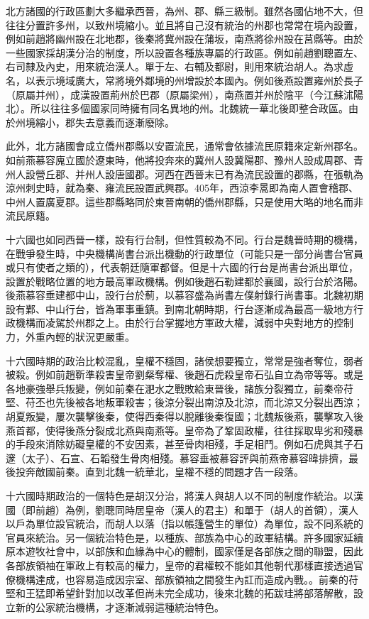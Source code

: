 北方諸國的行政區劃大多繼承西晉，為州、郡、縣三級制。雖然各國佔地不大，但往往分置許多州，以致州境縮小。並且將自己沒有統治的州郡也常常在境內設置，例如前趙將幽州設在北地郡，後秦將冀州設在蒲坂，南燕將徐州設在莒縣等。由於一些國家採胡漢分治的制度，所以設置各種族專屬的行政區。例如前趙劉聰置左、右司隸及內史，用來統治漢人。單于左、右輔及都尉，則用來統治胡人。為求虛名，以表示境域廣大，常將境外鄰境的州增設於本國內。例如後燕設置雍州於長子（原屬并州），成漢設置荊州於巴郡（原屬梁州），南燕置并州於陰平（今江蘇沭陽北）。所以往往多個國家同時擁有同名異地的州。北魏統一華北後即整合政區。由於州境縮小，郡失去意義而逐漸廢除。

此外，北方諸國會成立僑州郡縣以安置流民，通常會依據流民原籍來定新州郡名。如前燕慕容廆立國於遼東時，他將投奔來的冀州人設冀陽郡、豫州人設成周郡、青州人設營丘郡、并州人設唐國郡。河西在西晉末已有為流民設置的郡縣，在張軌為涼州刺史時，就為秦、雍流民設置武興郡。405年，西涼李暠即為南人置會稽郡、中州人置廣夏郡。這些郡縣略同於東晉南朝的僑州郡縣，只是使用大略的地名而非流民原籍。

十六國也如同西晉一樣，設有行台制，但性質較為不同。行台是魏晉時期的機構，在戰爭發生時，中央機構尚書台派出機動的行政單位（可能只是一部分尚書台官員或只有使者之類的），代表朝廷隨軍都督。但是十六國的行台是尚書台派出單位，設置於戰略位置的地方最高軍政機構。例如後趙石勒建都於襄國，設行台於洛陽。後燕慕容垂建都中山，設行台於薊，以慕容盛為尚書左僕射錄行尚書事。北魏初期設有鄴、中山行台，皆為軍事重鎮。到南北朝時期，行台逐漸成為最高一級地方行政機構而凌駕於州郡之上。由於行台掌握地方軍政大權，減弱中央對地方的控制力，外重內輕的狀況更嚴重。

十六國時期的政治比較混亂，皇權不穩固，諸侯想要獨立，常常是強者奪位，弱者被殺。例如前趙靳準殺害皇帝劉粲奪權、後趙石虎殺皇帝石弘自立為帝等等。或是各地豪強舉兵叛變，例如前秦在淝水之戰敗給東晉後，諸族分裂獨立，前秦帝苻堅、苻丕也先後被各地叛軍殺害；後涼分裂出南涼及北涼，而北涼又分裂出西涼；胡夏叛變，屢次襲擊後秦，使得西秦得以脫離後秦復國；北魏叛後燕，襲擊攻入後燕首都，使得後燕分裂成北燕與南燕等。皇帝為了鞏固政權，往往採取卑劣和殘暴的手段來消除妨礙皇權的不安因素，甚至骨肉相殘，手足相鬥。例如石虎與其子石邃（太子）、石宣、石韜發生骨肉相殘。慕容垂被慕容評與前燕帝慕容暐排擠，最後投奔敵國前秦。直到北魏一統華北，皇權不穩的問題才告一段落。

十六國時期政治的一個特色是胡汉分治，將漢人與胡人以不同的制度作統治。以漢國（即前趙）為例，劉聰同時居皇帝（漢人的君主）和單于（胡人的首領），漢人以戶為單位設官統治，而胡人以落（指以帳篷營生的單位）為單位，設不同系統的官員來統治。另一個統治特色是，以種族、部族為中心的政軍結構。許多國家延續原本遊牧社會中，以部族和血緣為中心的體制，國家僅是各部族之間的聯盟，因此各部族領袖在軍政上有較高的權力，皇帝的君權較不能如其他朝代那樣直接透過官僚機構達成，也容易造成因宗室、部族領袖之間發生內訌而造成內戰。。前秦的苻堅和王猛即希望針對加以改革但尚未完全成功，後來北魏的拓跋珪將部落解散，設立新的公家統治機構，才逐漸減弱這種統治特色。

